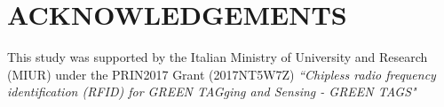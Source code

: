 \documentclass[a4paper, twosided]{book}
\begin{document}
\section[Acknowledgements]{\changefont ACKNOWLEDGEMENTS}\label{Sec4.4}
\noindent
This study was supported by the Italian Ministry of University and Research (MIUR) under the PRIN2017 Grant (2017NT5W7Z) \textsl{“Chipless radio frequency identification (RFID) for GREEN TAGging and Sensing - GREEN TAGS"} 

\printbibliography
\end{document}

